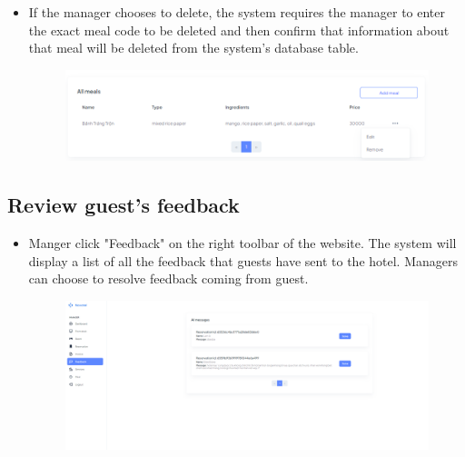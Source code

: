 \begin{itemize}
\begin{itemize}
\begin{figure}[H]
                \label{fig:editmeal}
            \end{figure}
            \item If the manager chooses to delete, the system requires the manager to enter the exact meal code to be deleted and then confirm that information about that meal will be deleted from the system's database table.
            \begin{figure}[H]
                \includegraphics[width=1\linewidth]{img/deletemeal.png}
                \label{fig:deletemeal}
            \end{figure}
        \end{itemize}
    \end{itemize}
    \subsection{Review guest’s feedback}
    \begin{itemize}
        \item Manger click "Feedback" on the right toolbar of the website. The system will display a list of all the feedback that guests have sent to the hotel. Managers can choose to resolve feedback coming from guest.
        \begin{figure}[H]
                \includegraphics[width=1\linewidth]{img/rv_feedback.png}
                \label{fig:rvfeedback}
            \end{figure}
    \end{itemize}
